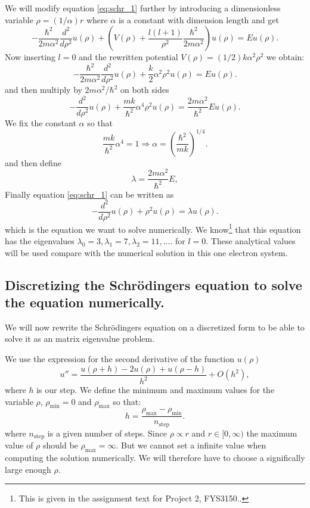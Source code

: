 \documentclass[11pt,a4wide]{article}
\begin{document}
We will modify equation \ref{eq:schr_1} further by introducing a dimensionless variable $\rho = (1/\alpha) r$ where $\alpha$ is a constant with dimension length and get
% 
\[
  -\frac{\hbar^2}{2 m \alpha^2} \frac{d^2}{d\rho^2} u(\rho) 
       + \left ( V(\rho) + \frac{l (l + 1)}{\rho^2}
         \frac{\hbar^2}{2 m\alpha^2} \right ) u(\rho)  = E u(\rho) .
\]
%
Now inserting $l=0$ and the rewritten potential $V(\rho) = (1/2) k \alpha^2\rho^2$ we obtain:
\[
  -\frac{\hbar^2}{2 m \alpha^2} \frac{d^2}{d\rho^2} u(\rho) 
       + \frac{k}{2} \alpha^2\rho^2u(\rho)  = E u(\rho) .
\]
and then multiply by $2m\alpha^2/\hbar^2$ on both sides
\[
  -\frac{d^2}{d\rho^2} u(\rho) 
       + \frac{mk}{\hbar^2} \alpha^4\rho^2u(\rho)  = \frac{2m\alpha^2}{\hbar^2}E u(\rho) .
\]
We fix the constant $\alpha$ so that
\[
\frac{mk}{\hbar^2} \alpha^4 = 1 \Rightarrow \alpha = \left(\frac{\hbar^2}{mk}\right)^{1/4}.
\]
and then define 
\[
\lambda = \frac{2m\alpha^2}{\hbar^2}E,
\]
Finally equation \ref{eq:schr_1} can be written as
\begin{equation}
  -\frac{d^2}{d\rho^2} u(\rho) + \rho^2u(\rho)  = \lambda u(\rho) .
  \label{eq: sch_1D_final}
\end{equation}
which is the equation we want to solve numerically. We know\footnote{This is given in the assignment text for Project 2, FYS3150..} that this equation has the eigenvalues $\lambda_0=3,\lambda_1=7,\lambda_2=11,\dots .$ for $l=0$. These analytical values will be used compare with the numerical solution in this one electron system.

\subsection{Discretizing the Schr\"odingers equation to solve the equation numerically.} \label{sec: descrete}
We will now rewrite the Schr\"odingers equation on a discretized form to be able to solve it as an matrix eigenvalue problem.

We use the expression for the second derivative of the function $u(\rho)$
\begin{equation}
    u''=\frac{u(\rho+h) -2u(\rho) +u(\rho-h)}{h^2} +O(h^2),
    \label{eq:diffoperation}
\end{equation} 
where $h$ is our step. We define the minimum and maximum values for the variable $\rho$,
$\rho_{\mathrm{min}}=0$  and $\rho_{\mathrm{max}}$ so that:
\[
  h=\frac{\rho_{\mathrm{max}}-\rho_{\mathrm{min}} }{n_{\mathrm{step}}}.
\]
where $n_{\mathrm{step}}$ is a given number of steps. Since $\rho \propto r$ and $r\in [0,\infty)$ the maximum value of $\rho$ should be $\rho_{\mathrm{max}}=\infty$. But we cannot set a infinite value when computing the solution numerically. We will therefore have to choose a significally large enough $\rho$.
\end{document}

